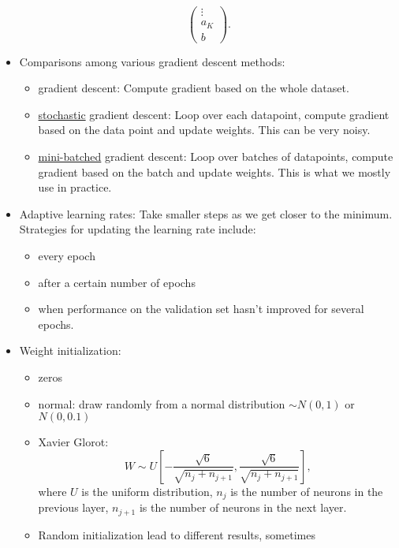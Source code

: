 \documentclass[twocolumn,landscape,10pt]{article}
\theoremstyle{definition}
\begin{document}
\begin{itemize}
\[\begin{pmatrix}
                    \vdots \\
                    a_K \\
                    b
            \end{pmatrix}.
        \]
    \item Comparisons among various gradient descent methods:
        \begin{itemize}
            \item gradient descent: Compute gradient based on the whole dataset.
            \item \underline{stochastic} gradient descent: Loop over each datapoint,
                compute gradient based on the data point and update
                weights. This can be very noisy.
            \item \underline{mini-batched} gradient descent: Loop over batches
                of datapoints, compute gradient based on the batch and update
                weights. This is what we mostly use in practice.
        \end{itemize} 
    \item Adaptive learning rates: Take smaller steps as we get closer to the
        minimum. Strategies for updating the learning rate include:
        \begin{itemize}
            \item every epoch
            \item after a certain number of epochs
            \item when performance on the validation set hasn't improved for
                several epochs.
        \end{itemize} 
    \item Weight initialization:
        \begin{itemize}
            \item zeros
            \item normal: draw randomly from a normal distribution $\sim N(0,1)$ or
                $N(0,0.1)$
            \item Xavier Glorot:
                \[
                    W\sim
                    U\left[-\frac{\sqrt{6}}{\sqrt{n_j+n_{j+1}}},\frac{\sqrt{6}}{\sqrt{n_j+n_{j+1}}}\right],
                \]
                where $U$ is the uniform distribution, $n_j$ is the number of
                neurons in the previous layer, $n_{j+1}$ is the number of
                neurons in the next layer.
            \item Random initialization lead to different results, sometimes

\end{itemize}
\end{itemize}
\end{document}
